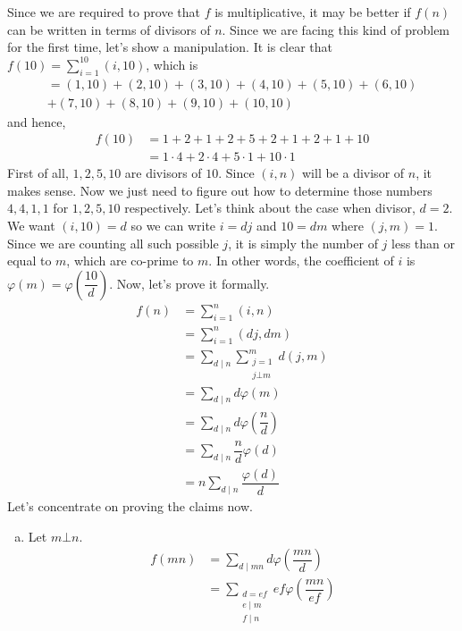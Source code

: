 \documentclass[problems.tex]{subfile}
\begin{document}
	\begin{solution}
		Since we are required to prove that $f$ is multiplicative, it may be better if $f(n)$ can be written in terms of divisors of $n$. Since we are facing this kind of problem for the first time, let's show a manipulation. It is clear that $f(10) = \sum_{i=1}^{10}(i,10)$, which is
			\begin{multline*}
					  = (1,10)+(2,10)+(3,10)+(4,10)+(5,10)+(6,10)\\+(7,10)+(8,10)+(9,10)+(10,10)
			\end{multline*}
		and hence,
			\begin{align*}
				f(10)
					& = 1+2+1+2+5+2+1+2+1+10\\
					& = 1\cdot4+2\cdot4+5\cdot1+10\cdot1
			\end{align*}
		First of all, $1,2,5,10$ are divisors of $10$. Since $(i,n)$ will be a divisor of $n$, it makes sense. Now we just need to figure out how to determine those numbers $4,4,1,1$ for $1,2,5,10$ respectively. Let's think about the case when divisor, $d=2$. We want $(i,10)=d$ so we can write $i=dj$ and $10=dm$ where $(j,m)=1$. Since we are counting all such possible $j$, it is simply the number of $j$ less than or equal to $m$, which are co-prime to $m$. In other words, the coefficient of $i$ is $\varphi(m)=\varphi\left(\dfrac{10}{d}\right)$. Now, let's prove it formally.
			\begin{align*}
				f(n)
					& = \sum_{i=1}^{n}(i,n)\\
					& = \sum_{i=1}^{n}(dj,dm)\\
					& = \sum_{d\mid n}\sum_{\substack{j=1\\j\bot m}}^{m}d(j,m)\\
					& = \sum_{d\mid n}d\varphi(m)\\
					& = \sum_{d\mid n}d\varphi\left(\dfrac{n}{d}\right)\\
					& = \sum_{d\mid n}\dfrac{n}{d}\varphi(d)\\
					& = n\sum_{d\mid n}\dfrac{\varphi(d)}{d}
			\end{align*}
		Let's concentrate on proving the claims now.
			\begin{enumerate}[(a)]
				\item Let $m\bot n$.
						\begin{align*}
							f(mn) & = \sum_{d\mid mn}d\varphi\left(\dfrac{mn}{d}\right)\\
								  & = \sum_{\substack{d=ef\\e\mid m\\f\mid n}}ef\varphi\left(\dfrac{mn}{ef}\right)\\

\end{align*}
\end{enumerate}
\end{solution}
\end{document}
